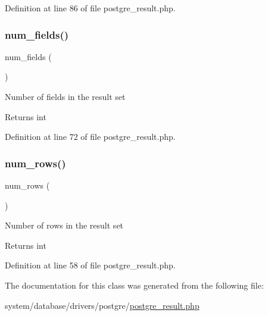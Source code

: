 Definition at line 86 of file postgre\+\_\+result.\+php.

\mbox{\label{class_c_i___d_b__postgre__result_af831bf363e4d7d661a717a4932af449d}} 
\subsubsection{\texorpdfstring{num\_fields()}{num\_fields()}}
{\footnotesize\ttfamily num\+\_\+fields (\begin{DoxyParamCaption}{ }\end{DoxyParamCaption})}

Number of fields in the result set

\begin{DoxyReturn}{Returns}
int 
\end{DoxyReturn}


Definition at line 72 of file postgre\+\_\+result.\+php.

\mbox{\label{class_c_i___d_b__postgre__result_a218657c303ee499b97710ab0cd2f5d6e}} 
\subsubsection{\texorpdfstring{num\_rows()}{num\_rows()}}
{\footnotesize\ttfamily num\+\_\+rows (\begin{DoxyParamCaption}{ }\end{DoxyParamCaption})}

Number of rows in the result set

\begin{DoxyReturn}{Returns}
int 
\end{DoxyReturn}


Definition at line 58 of file postgre\+\_\+result.\+php.



The documentation for this class was generated from the following file\+:\begin{DoxyCompactItemize}
\item 
system/database/drivers/postgre/\mbox{\hyperlink{postgre__result_8php}{postgre\+\_\+result.\+php}}\end{DoxyCompactItemize}
